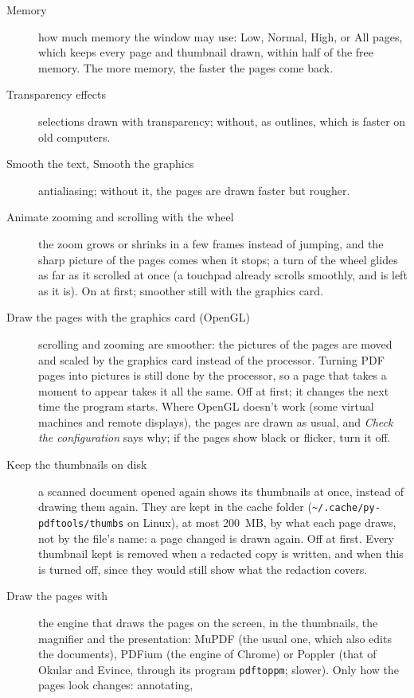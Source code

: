 \documentclass[12pt,
              article,
              oneside
              ]{memoir}
\newcommand*{\menu}[1]{\textit{#1}}
\begin{document}
%
\begin{description}
\item[Memory] how much memory the window may use: Low, Normal, High, or All
  pages, which keeps every page and thumbnail drawn, within half of the free
  memory. The more memory, the faster the pages come back.
\item[Transparency effects] selections drawn with transparency; without,
  as outlines, which is faster on old computers.
\item[Smooth the text, Smooth the graphics] antialiasing; without it, the
  pages are drawn faster but rougher.
\item[Animate zooming and scrolling with the wheel] the zoom grows or
  shrinks in a few frames instead of jumping, and the sharp picture of the
  pages comes when it stops; a turn of the wheel glides as far as it
  scrolled at once (a touchpad already scrolls smoothly, and is left as it
  is). On at first; smoother still with the graphics card.
\item[Draw the pages with the graphics card (OpenGL)] scrolling and
  zooming are smoother: the pictures of the pages are moved and scaled by
  the graphics card instead of the processor. Turning PDF pages into
  pictures is still done by the processor, so a page that takes a moment
  to appear takes it all the same. Off at first; it changes the next time
  the program starts. Where OpenGL doesn't work (some virtual machines and
  remote displays), the pages are drawn as usual, and \menu{Check the
  configuration} says why; if the pages show black or flicker, turn it
  off.
\item[Keep the thumbnails on disk] a scanned document opened again shows
  its thumbnails at once, instead of drawing them again. They are kept in
  the cache folder (\texttt{\textasciitilde/.cache/py-pdftools/thumbs} on
  Linux), at most 200~MB, by what each page draws, not by the file's name:
  a page changed is drawn again. Off at first. Every thumbnail kept is
  removed when a redacted copy is written, and when this is turned off,
  since they would still show what the redaction covers.
\item[Draw the pages with] the engine that draws the pages on the
  screen, in the thumbnails, the magnifier and the presentation: MuPDF
  (the usual one, which also edits the documents), PDFium (the engine of
  Chrome) or Poppler (that of Okular and Evince, through its program
  \texttt{pdftoppm}; slower). Only how the pages look changes: annotating,

\end{description}
\end{document}
